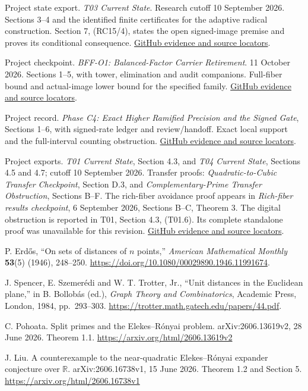 Project state export. \emph{T03 Current State}. Research cutoff 10 September 2026. Sections 3--4 and the identified finite certificates for the adaptive radical construction. Section 7, (RC15/4), states the open signed-image premise and proves its conditional consequence. \href{https://github.com/hnt119/polynomial-image-compression/blob/bd1f2d663262821575eebdfa559b7c25f76b46ab/research/exports/2026-11-05-report-references/README.md#ref14}{GitHub evidence and source locators}.

Project checkpoint. \emph{BFF-O1: Balanced-Factor Carrier Retirement}. 11 October 2026. Sections 1--5, with tower, elimination and audit companions. Full-fiber bound and actual-image lower bound for the specified family. \href{https://github.com/hnt119/polynomial-image-compression/blob/bd1f2d663262821575eebdfa559b7c25f76b46ab/research/exports/2026-11-05-report-references/README.md#ref15}{GitHub evidence and source locators}.

Project record. \emph{Phase C4: Exact Higher Ramified Precision and the Signed Gate}, Sections 1--6, with signed-rate ledger and review/handoff. Exact local support and the full-interval counting obstruction. \href{https://github.com/hnt119/polynomial-image-compression/blob/bd1f2d663262821575eebdfa559b7c25f76b46ab/research/exports/2026-11-05-report-references/README.md#ref16}{GitHub evidence and source locators}.

Project exports. \emph{T01 Current State}, Section 4.3, and \emph{T04 Current State}, Sections 4.5 and 4.7; cutoff 10 September 2026. Transfer proofs: \emph{Quadratic-to-Cubic Transfer Checkpoint}, Section D.3, and \emph{Complementary-Prime Transfer Obstruction}, Sections B--F. The rich-fiber avoidance proof appears in \emph{Rich-fiber results checkpoint}, 6 September 2026, Sections B--C, Theorem 3. The digital obstruction is reported in T01, Section 4.3, (T01.6). Its complete standalone proof was unavailable for this revision. \href{https://github.com/hnt119/polynomial-image-compression/blob/bd1f2d663262821575eebdfa559b7c25f76b46ab/research/exports/2026-11-05-report-references/README.md#ref17}{GitHub evidence and source locators}.

P. Erd\H{o}s, ``On sets of distances of $n$ points,'' \emph{American Mathematical Monthly} \textbf{53}(5) (1946), 248--250.
\url{https://doi.org/10.1080/00029890.1946.11991674}.

J. Spencer, E. Szemer\'edi and W. T. Trotter, Jr., ``Unit distances in the Euclidean plane,'' in B. Bollob\'as (ed.), \emph{Graph Theory and Combinatorics}, Academic Press, London, 1984, pp.~293--303.
\url{https://trotter.math.gatech.edu/papers/44.pdf}.

C. Pohoata. Split primes and the Elekes--R\'onyai problem. arXiv:2606.13619v2, 28 June 2026. Theorem 1.1. \url{https://arxiv.org/html/2606.13619v2}

J. Liu. A counterexample to the near-quadratic Elekes--R\'onyai expander conjecture over $\mathbb R$. arXiv:2606.16738v1, 15 June 2026. Theorem 1.2 and Section 5. \url{https://arxiv.org/html/2606.16738v1}
